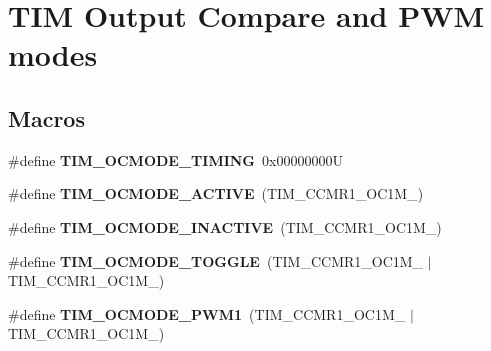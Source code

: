 \hypertarget{group___t_i_m___output___compare__and___p_w_m__modes}{}\section{T\+IM Output Compare and P\+WM modes}
\label{group___t_i_m___output___compare__and___p_w_m__modes}
\subsection*{Macros}
\begin{DoxyCompactItemize}
\item 
\mbox{\label{group___t_i_m___output___compare__and___p_w_m__modes_gafae6b98b4b854fbfffd9a5ebc59c8f61}} 
\#define {\bfseries T\+I\+M\+\_\+\+O\+C\+M\+O\+D\+E\+\_\+\+T\+I\+M\+I\+NG}~0x00000000U
\item 
\mbox{\label{group___t_i_m___output___compare__and___p_w_m__modes_ga111d1023e3ac6ef5544775c3863b4b12}} 
\#define {\bfseries T\+I\+M\+\_\+\+O\+C\+M\+O\+D\+E\+\_\+\+A\+C\+T\+I\+VE}~(T\+I\+M\+\_\+\+C\+C\+M\+R1\+\_\+\+O\+C1\+M\+\_)
\item 
\mbox{\label{group___t_i_m___output___compare__and___p_w_m__modes_ga890fbb44fd16f2bce962983352d23f53}} 
\#define {\bfseries T\+I\+M\+\_\+\+O\+C\+M\+O\+D\+E\+\_\+\+I\+N\+A\+C\+T\+I\+VE}~(T\+I\+M\+\_\+\+C\+C\+M\+R1\+\_\+\+O\+C1\+M\+\_)
\item 
\mbox{\label{group___t_i_m___output___compare__and___p_w_m__modes_ga368f80fad76018e2bf76084522e47536}} 
\#define {\bfseries T\+I\+M\+\_\+\+O\+C\+M\+O\+D\+E\+\_\+\+T\+O\+G\+G\+LE}~(T\+I\+M\+\_\+\+C\+C\+M\+R1\+\_\+\+O\+C1\+M\+\_ $\vert$ T\+I\+M\+\_\+\+C\+C\+M\+R1\+\_\+\+O\+C1\+M\+\_)
\item 
\mbox{\label{group___t_i_m___output___compare__and___p_w_m__modes_ga766271da571888dfecd9130c3887e9c6}} 
\#define {\bfseries T\+I\+M\+\_\+\+O\+C\+M\+O\+D\+E\+\_\+\+P\+W\+M1}~(T\+I\+M\+\_\+\+C\+C\+M\+R1\+\_\+\+O\+C1\+M\+\_ $\vert$ T\+I\+M\+\_\+\+C\+C\+M\+R1\+\_\+\+O\+C1\+M\+\_)

\end{DoxyCompactItemize}
